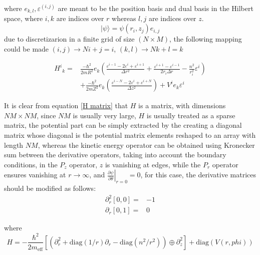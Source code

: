 \documentclass[twoside,11pt]{article}
\begin{document}
        where $e_{k, l}, \varepsilon^{(i, j)}$ are meant to be the position basis and dual basis in the Hilbert space, where $i, k$ are indices over $r$ whereas $l, j$ are indices over $z$.
        \begin{equation}
            \vert \psi \rangle = \psi(r_i, z_j) e_{i, j}
        \end{equation}
        due to discretizarion in a finite grid of size $(N\times M)$, the following mapping could be made $(i, j) \to Ni + j = i$, $(k, l) \to Nk + l = k$
        
        \begin{equation}
            \begin{split}
            {H^i}_k = & \frac{-\hbar^2}{2mR^2}e_k \left(\frac{\varepsilon^{i-1} -2\varepsilon^{i} + \varepsilon^{i+1}}{\Delta r^2} + \frac{\varepsilon^{i+1}-\varepsilon^{i-1}}{2r_i\Delta r} - \frac{n^2}{r_i^2}\varepsilon^{i}\right) \\
            & + \frac{-\hbar^2}{2mZ^2}e_{k}\left(\frac{\varepsilon^{i-N} -2\varepsilon^{i} + \varepsilon^{i+N}}{\Delta z^2}\right) + V^i e_{k}\varepsilon^{i}
            \end{split}
            \label{H matrix}
        \end{equation}
        
        It is clear from equation \ref{H matrix} that $H$ is a matrix, with dimensions $NM \times NM$, since $NM$ is usually very large, $H$ is usually treated as a sparse matrix, the potential part can be simply extracted by the creating a diagonal matrix whose diagonal is the potential matrix elements reshaped to an array with length $NM$, whereas the kinetic energy operator can be obtained using Kronecker sum between the derivative operators, taking into account the boundary conditions, in the $P_z$ operator, $z$ is vanishing at edges, while the $P_r$ operator ensures vanishing at $r \to \infty$, and $\left.\frac{\partial \psi}{\partial \theta}\right|_{r = 0} = 0$, for this case, the derivative matrices should be modified as follows:
        \begin{equation}
            \begin{split}
                \partial^2_r [0, 0] =& -1\\
                \partial_r [0, 1] =& 0
            \end{split}
            \label{BCs}
        \end{equation}
        
        where
        \begin{equation}
            H = -\frac{\hbar^2}{2m_{\text{eff}}}\left[\left(\partial_r^2 + \text{diag}(1/r)\partial_r - \text{diag}(n^2/r^2)\right) \oplus \partial_z^2\right] + \text{diag}(V(r, phi))
            \label{comp eq}
        \end{equation}
\end{document}
